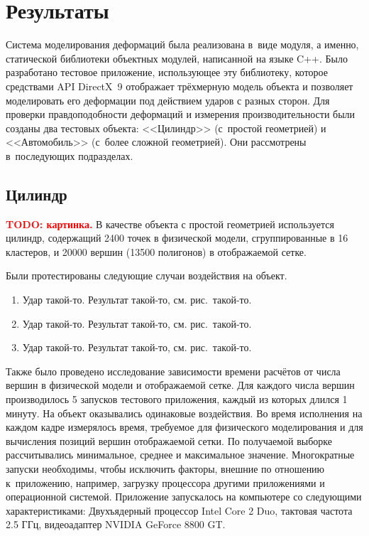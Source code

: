 \documentclass[a4paper, 14pt, titlepage]{extarticle}
\newcommand{\todo}[1]{\textbf{\textcolor{red}{TODO: #1}}}
\let\oldsection\section
\renewcommand{\section}{\newpage\oldsection}
\begin{document}
  \section{Результаты}\label{sec:results}

    Система моделирования деформаций была реализована в~виде модуля, а именно, статической
    библиотеки объектных модулей, написанной на языке C++.
    Было разработано тестовое приложение, использующее эту библиотеку, которое
    средствами API DirectX~9 отображает трёхмерную модель объекта и позволяет моделировать его
    деформации под действием ударов с разных сторон. Для проверки правдоподобности деформаций и
    измерения производительности были созданы два тестовых объекта: <<Цилиндр>> (с~простой
    геометрией) и <<Автомобиль>> (с~более сложной геометрией).  Они рассмотрены в~последующих
    подразделах.

    \subsection{Цилиндр}

      \todo{картинка.} В качестве объекта с простой геометрией используется цилиндр, содержащий
      2400 точек в физической модели, сгруппированные в 16 кластеров, и 20000 вершин (13500
      полигонов) в отображаемой сетке.

      Были протестированы следующие случаи воздействия на объект.
      \begin{enumerate}
        \item Удар такой-то. Результат такой-то, см. рис.~такой-то.
        \item Удар такой-то. Результат такой-то, см. рис.~такой-то.
        \item Удар такой-то. Результат такой-то, см. рис.~такой-то.
      \end{enumerate}

      Также было проведено исследование зависимости времени расчётов от числа вершин в физической
      модели и отображаемой сетке. Для каждого числа вершин производилось 5 запусков тестового
      приложения, каждый из которых длился 1 минуту. На объект оказывались одинаковые воздействия. Во время
      исполнения на каждом кадре измерялось время, требуемое для физического моделирования и для
      вычисления позиций вершин отображаемой сетки. По получаемой выборке рассчитывались
      минимальное, среднее и максимальное значение. Многократные запуски необходимы, чтобы исключить
      факторы, внешние по отношению к~приложению, например, загрузку процессора другими приложениями
      и операционной системой. Приложение запускалось на компьютере со следующими характеристиками:
      Двухъядерный процессор Intel Core 2 Duo, тактовая частота 2.5 ГГц, видеоадаптер NVIDIA GeForce
      8800 GT.
\end{document}
